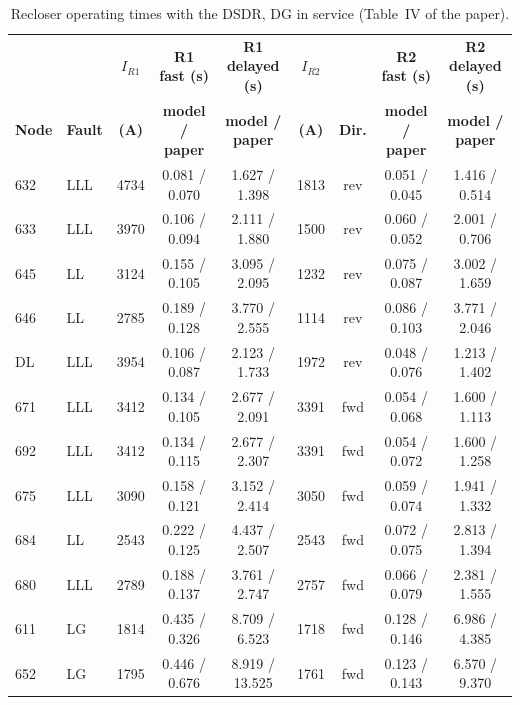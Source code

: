 \documentclass[12pt,letterpaper]{article}
\newcommand{\hd}{\rowcolor{headc}}
\begin{document}
\begin{table}[H]
\centering\footnotesize
\setlength{\tabcolsep}{4pt}
\begin{tabular}{@{}llccccccc@{}}
\toprule
\hd & & \textbf{$I_{R1}$} & \textbf{R1 fast (s)} & \textbf{R1 delayed (s)} & \textbf{$I_{R2}$} & & \textbf{R2 fast (s)} & \textbf{R2 delayed (s)} \\
\hd\textbf{Node} & \textbf{Fault} & \textbf{(A)} & \textbf{model / paper} & \textbf{model / paper} & \textbf{(A)} & \textbf{Dir.} & \textbf{model / paper} & \textbf{model / paper} \\
\midrule
632 & LLL & 4734 & 0.081 / 0.070 & 1.627 / 1.398 & 1813 & rev & 0.051 / 0.045 & 1.416 / 0.514 \\
633 & LLL & 3970 & 0.106 / 0.094 & 2.111 / 1.880 & 1500 & rev & 0.060 / 0.052 & 2.001 / 0.706 \\
645 & LL & 3124 & 0.155 / 0.105 & 3.095 / 2.095 & 1232 & rev & 0.075 / 0.087 & 3.002 / 1.659 \\
646 & LL & 2785 & 0.189 / 0.128 & 3.770 / 2.555 & 1114 & rev & 0.086 / 0.103 & 3.771 / 2.046 \\
DL & LLL & 3954 & 0.106 / 0.087 & 2.123 / 1.733 & 1972 & rev & 0.048 / 0.076 & 1.213 / 1.402 \\
671 & LLL & 3412 & 0.134 / 0.105 & 2.677 / 2.091 & 3391 & fwd & 0.054 / 0.068 & 1.600 / 1.113 \\
692 & LLL & 3412 & 0.134 / 0.115 & 2.677 / 2.307 & 3391 & fwd & 0.054 / 0.072 & 1.600 / 1.258 \\
675 & LLL & 3090 & 0.158 / 0.121 & 3.152 / 2.414 & 3050 & fwd & 0.059 / 0.074 & 1.941 / 1.332 \\
684 & LL & 2543 & 0.222 / 0.125 & 4.437 / 2.507 & 2543 & fwd & 0.072 / 0.075 & 2.813 / 1.394 \\
680 & LLL & 2789 & 0.188 / 0.137 & 3.761 / 2.747 & 2757 & fwd & 0.066 / 0.079 & 2.381 / 1.555 \\
611 & LG & 1814 & 0.435 / 0.326 & 8.709 / 6.523 & 1718 & fwd & 0.128 / 0.146 & 6.986 / 4.385 \\
652 & LG & 1795 & 0.446 / 0.676 & 8.919 / 13.525 & 1761 & fwd & 0.123 / 0.143 & 6.570 / 9.370 \\
\bottomrule
\end{tabular}
\caption{Recloser operating times with the DSDR, DG in service (Table~IV of the paper).}
\label{tab:t4a}
\end{table}
\end{document}
